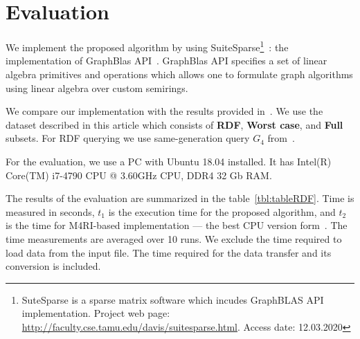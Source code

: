 \section{Evaluation}

We implement the proposed algorithm by using SuiteSparse\footnote{SuteSparse is a sparse matrix software which incudes GraphBLAS API implementation. Project web page: \url{http://faculty.cse.tamu.edu/davis/suitesparse.html}. Access date: 12.03.2020}~\cite{Davis2018Algorithm9S}: the implementation of GraphBlas API~\cite{7761646}.
GraphBlas API specifies a set of linear algebra primitives and operations which allows one to formulate graph algorithms using linear algebra over custom semirings.

We compare our implementation with the results provided in~\cite{10.1145/3327964.3328503}.
We use the dataset described in this article which consists of \textbf{RDF}, \textbf{Worst case}, and \textbf{Full} subsets.
For RDF querying we use same-generation query $G_4$ from~\cite{10.1145/3327964.3328503}.

For the evaluation, we use a PC with Ubuntu 18.04 installed.
It has Intel(R) Core(TM) i7-4790 CPU @ 3.60GHz CPU, DDR4 32 Gb RAM.

The results of the evaluation are summarized in the table~\ref{tbl:tableRDF}.
Time is measured in seconds, $t_1$ is the execution time for the proposed algorithm, and $t_2$ is the time for M4RI-based implementation --- the best CPU version form~\cite{10.1145/3327964.3328503}.
The time measurements are averaged over 10 runs.
We exclude the time required to load data from the input file.
The time required for the data transfer and its conversion is included.

